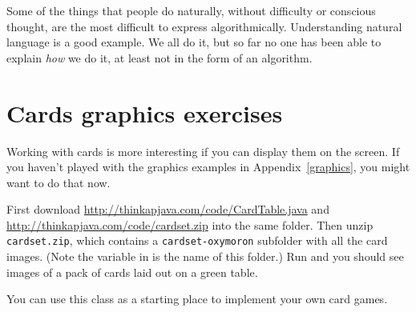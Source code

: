Some of the things that people do naturally, without difficulty
or conscious thought, are the most difficult to express
algorithmically.  Understanding natural language is a good
example.  We all do it, but so far no one has been able to
explain {\em how} we do it, at least not in the form of an
algorithm.




\section{Cards graphics exercises}

\begin{exercise}
Working with cards is more interesting if you can display them on the screen.
If you haven't played with the graphics examples in Appendix~\ref{graphics}, you might want to do that now.

First download
\url{http://thinkapjava.com/code/CardTable.java}
and
\url{http://thinkapjava.com/code/cardset.zip} into the same folder.
Then unzip {\tt cardset.zip}, which contains a {\tt cardset-oxymoron}
subfolder with all the card images. (Note the variable 
in  is the name of this folder.)
Run  and you
should see images of a pack of cards laid out on a green table.

You can use this class as a starting place to implement your own
card games.
\end{exercise}



